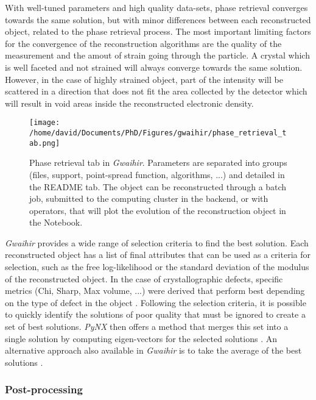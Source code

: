With well-tuned parameters and high quality data-sets, phase retrieval converges towards the same solution, but with minor differences between each reconstructed object, related to the phase retrieval process.
The most important limiting factors for the convergence of the reconstruction algorithms are the quality of the measurement and the amout of strain going through the particle.
A crystal which is well faceted and not strained will always converge towards the same solution.
However, in the case of highly strained object, part of the intensity will be scattered in a direction that does not fit the area collected by the detector which will result in void areas inside the reconstructed electronic density.

\begin{figure}[!htb]
    \centering
    \texttt{[image: /home/david/Documents/PhD/Figures/gwaihir/phase\_retrieval\_tab.png]}
    \caption{Phase retrieval tab in \textit{Gwaihir}. Parameters are separated into groups (files, support, point-spread function, algorithms, ...) and detailed in the README tab. The object can be reconstructed through a batch job, submitted to the computing cluster in the backend, or with operators, that will plot the evolution of the reconstruction object in the Notebook.}
    \label{fig:PRT}
\end{figure}

\textit{Gwaihir} provides a wide range of selection criteria to find the best solution.
Each reconstructed object has a list of final attributes that can be used as a criteria for selection, such as the free log-likelihood \parencite{pynx2020FLLK} or the standard deviation of the modulus of the reconstructed object.
In the case of crystallographic defects, specific metrics (Chi, Sharp, Max volume, ...) were derived that perform best depending on the type of defect in the object \parencite{Ulvestad2017}.
Following the selection criteria, it is possible to quickly identify the solutions of poor quality that must be ignored to create a set of best solutions.
\textit{PyNX} then offers a method that merges this set into a single solution by computing eigen-vectors for the selected solutions \parencite{pynx2020FLLK}.
An alternative approach also available in \textit{Gwaihir} is to take the average of the best solutions \parencite{ulvestad_nanoscale_2014}.

\subsubsection{Post-processing}

